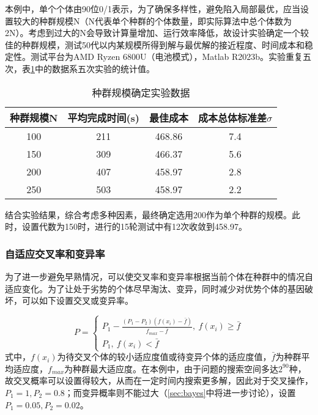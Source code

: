\documentclass[withoutpreface,bwprint]{cumcmthesis} %
\begin{document}
本例中，单个个体由90位0/1表示，为了确保多样性，避免陷入局部最优，应当设置较大的种群规模N（N代表单个种群的个体数量，即实际算法中总个体数为2N）。考虑到过大的N会导致计算量增加、运行效率降低，故设计实验确定一个较佳的种群规模，测试50代以内某规模所得到解与最优解的接近程度、时间成本和稳定性。测试平台为AMD Ryzen 6800U（电池模式），Matlab R2023b。实验重复五次，表\ref{tab:Nexp}中的数据系五次实验的统计值。

\begin{table}[htbp]
    \centering
    \caption{种群规模确定实验数据}
    \begin{tabular}{cccc}
    \toprule
        种群规模N & 平均完成时间(s) & 最佳成本 & 成本总体标准差$\sigma$ \\
    \midrule
        100 & 211 & 468.86 & 7.4\\
        150 & 309 & 466.37 & 5.6\\
        200 & 407 & 458.97 & 2.8\\
        250 & 503 & 458.97 & 2.2\\
    \bottomrule
    \end{tabular}
    \label{tab:Nexp}
\end{table}

结合实验结果，综合考虑多种因素，最终确定选用200作为单个种群的规模。此时，设置代数为150时，进行的15轮测试中有12次收敛到458.97。

\subsubsection{自适应交叉率和变异率}

为了进一步避免早熟情况，可以使交叉率和变异率根据当前个体在种群中的情况自适应变化\cite{selfadapt}。为了让处于劣势的个体尽早淘汰、变异，同时减少对优势个体的基因破坏，可以如下设置交叉或变异率。

\begin{equation}\label{eqn-5}
    P=\left\{ 
    \begin{matrix}
        P_1-\frac{(P_1-P_2)(f(x_i)-\bar f)}{f_{max}-\bar f},\  f(x_i)\ge \bar f\\
        P_1,\  f(x_i)< \bar f
    \end{matrix}
    \right.
\end{equation}
式中，$f(x_i)$为待交叉个体的较小适应度值或待变异个体的适应度值，$\bar f$为种群平均适应度，$f_{max}$为种群最大适应度。在本例中，由于问题的搜索空间多达$2^{90}$种，故交叉概率可以设置得较大，从而在一定时间内搜索更多解，因此对于交叉操作，$P_1=1,P_2=0.8$；而变异概率则不能过大（\ref{sec:bayes}中将进一步讨论），设置$P_1=0.05,P_2=0.02$。
\end{document}
